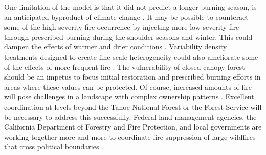 One limitation of the model is that it did not predict a longer burning season, is an anticipated byproduct of climate change \citep{Westerling2008,Stephens2013}. It may be possible to counteract some of the high severity fire occurrence by injecting more low severity fire through prescribed burning during the shoulder seasons and winter. This could dampen the effects of warmer and drier conditions \citep{Conard2003}. Variability density treatments designed to create fine-scale heterogeneity could also ameliorate some of the effects of more frequent fire \citep{Stephens2010,Knapp2012,North2012a}. The vulnerability of closed canopy forest should be an impetus to focus initial restoration and prescribed burning efforts in areas where these values can be protected. Of course, increased amounts of fire will pose challenges in a landscape with complex ownership patterns \citep{Stephens2013}. Excellent coordination at levels beyond the Tahoe National Forest or the Forest Service will be necessary to address this successfully. Federal land management agencies, the California Department of Forestry and Fire Protection, and local governments are working together more and more to coordinate fire suppression of large wildfires that cross political boundaries \citep{InteragencyAgreement2013}.

